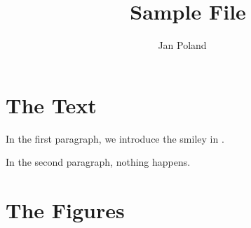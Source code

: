\documentclass{article}
\title{\FigBib\ Sample File}
\author{Jan Poland}
\begin{document}
\maketitle

\section*{The Text}

In the first paragraph, we introduce the smiley in
.


In the second paragraph, nothing happens.

\begin{fbFloat}[b!] %
\begin{fbMinipage}{6cm}
\end{fbMinipage}
\fbhspace{3cm}
\end{fbFloat}

\section*{The Figures}
\fbTheFigs

\end{document}
